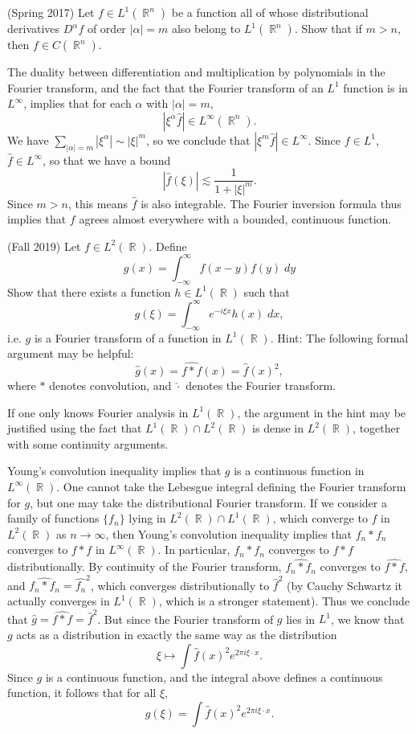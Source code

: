 \documentclass{exam}
\DeclareMathOperator{\RR}{\mathbb{R}}
\theoremstyle{problemstyle}
\newcommand{\1}[1]{\textbf{1}_{\left[#1\right]}} %
\begin{document}
\begin{questions}
\question (Spring 2017) Let $f \in L^1(\RR^n)$ be a function all of whose distributional derivatives $D^\alpha f$ of order $|\alpha| = m$ also belong to $L^1(\RR^n)$. Show that if $m > n$, then $f \in C(\RR^n)$.
\begin{solution}
    The duality between differentiation and multiplication by polynomials in the Fourier transform, and the fact that the Fourier transform of an $L^1$ function is in $L^\infty$, implies that for each $\alpha$ with $|\alpha| = m$,
    \[ |\xi^\alpha \widehat{f}| \in L^\infty(\RR^n). \]
    We have $\sum_{|\alpha| = m} |\xi^\alpha| \sim |\xi|^m$, so we conclude that $|\xi^m \widehat{f}| \in L^\infty$. Since $f \in L^1$, $\widehat{f} \in L^\infty$, so that we have a bound
    \[ |\widehat{f}(\xi)| \lesssim \frac{1}{1 + |\xi|^m}. \]
    Since $m > n$, this means $\widehat{f}$ is also integrable. The Fourier inversion formula thus implies that $f$ agrees almost everywhere with a bounded, continuous function.
\end{solution}

\question (Fall 2019) Let $f \in L^2(\RR)$. Define
%
\[ g(x) = \int_{-\infty}^\infty f(x-y) f(y)\; dy \]
%
Show that there exists a function $h \in L^1(\RR)$ such that
%
\[ g(\xi) = \int_{-\infty}^\infty e^{- i \xi x} h(x)\; dx, \]
%
i.e. $g$ is a Fourier transform of a function in $L^1(\RR)$. Hint: The following formal argument may be helpful:
%
\[ \widehat{g}(x) = \widehat{f * f}(x) = \widehat{f}(x)^2, \]
%
where $*$ denotes convolution, and $\widehat{\cdot}$ denotes the Fourier transform.
\begin{solution}
    If one only knows Fourier analysis in $L^1(\RR)$, the argument in the hint may be justified using the fact that $L^1(\RR) \cap L^2(\RR)$ is dense in $L^2(\RR)$, together with some continuity arguments.
    
    Young's convolution inequality implies that $g$ is a continuous function in $L^\infty(\RR)$. One cannot take the Lebesgue integral defining the Fourier transform for $g$, but one may take the distributional Fourier transform. If we consider a family of functions $\{ f_n \}$ lying in $L^2(\RR) \cap L^1(\RR)$, which converge to $f$ in $L^2(\RR)$ as $n \to \infty$, then Young's convolution inequality implies that $f_n * f_n$ converges to $f * f$ in $L^\infty(\RR)$. In particular, $f_n * f_n$ converges to $f * f$ distributionally. By continuity of the Fourier transform, $\widehat{f_n * f_n}$ converges to $\widehat{f * f}$, and $\widehat{f_n * f_n} = \widehat{f_n}^2$, which converges distributionally to $\widehat{f}^2$ (by Cauchy Schwartz it actually converges in $L^1(\RR)$, which is a stronger statement). Thus we conclude that $\widehat{g} = \widehat{f * f} = \widehat{f}^2$. But since the Fourier transform of $g$ lies in $L^1$, we know that $g$ acts as a distribution in exactly the same way as the distribution
    \[ \xi \mapsto \int \widehat{f}(x)^2 e^{2 \pi i \xi \cdot x}. \]
    Since $g$ is a continuous function, and the integral above defines a continuous function, it follows that for all $\xi$,
    \[ g(\xi) = \int \widehat{f}(x)^2 e^{2 \pi i \xi \cdot x}. \]
\end{solution}


\end{questions}
\end{document}
